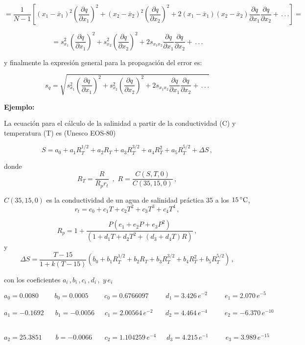 \documentclass[
]{agujournal2019}
\begin{document}
\[=\frac{1}{N-1}\left[
\left(x_1 - \bar{x}_1\right)^2\left(\frac{\partial{q}}{\partial{x_1}}\right)^2 +
\left(x_2 - \bar{x}_2\right)^2\left(\frac{\partial{q}}{\partial{x_2}}\right)^2 +
2\left(x_1 - \bar{x}_1\right)\left(x_2 - \bar{x}_2\right)
\frac{\partial{q}}{\partial{x_1}}\frac{\partial{q}}{\partial{x_2}}+\,.\,.\,.\right]=\]

\[=s^2_{x_1}\left(\frac{\partial{q}}{\partial{x_1}}\right)^2 +
   s^2_{x_2}\left(\frac{\partial{q}}{\partial{x_2}}\right)^2+
   2 s_{{x_1}{x_2}}
   \frac{\partial{q}}{\partial{x_1}}\frac{\partial{q}}{\partial{x_2}}+\,.\,.\,.\]

y finalmente la expresión general para la propagación del error es:

\[s_{q}=\sqrt{s^2_{x_1}\left(\frac{\partial{q}}{\partial{x_1}}\right)^2 +
               s^2_{x_2}\left(\frac{\partial{q}}{\partial{x_2}}\right)^2+
                2 s_{{x_1}{x_2}}
                \frac{\partial{q}}{\partial{x_1}}\frac{\partial{q}}{\partial{x_2}}+\,.\,.\,.}\]

\vspace{0.5cm}

\textbf{Ejemplo:}

\noindent La ecuación para el cálculo de la salinidad a partir de la
conductividad (C) y temperatura (T) es (Unesco EOS-80)

\[S=a_0+a_1 R_T^{1/2}+a_2 R_T+a_3 R_T^{3/2}+a_4 R_T^{2}+a_5 R_T^{5/2}+\Delta{S}\,,\]

donde
\[R_T=\frac{R}{R_p r_t}\,\,\,,\,\,R=\frac{C(S,T,0)}{C(35,15,0)}\,,\]

\(C(35,15,0)\) es la conductividad de un agua de salinidad práctica 35 a
los \(15\,^\circ{\rm C}\),
\[r_t=c_0 + c_1 T + c_2 T^2 + c_3T^3 + c_4T^4\,,\]

\[R_p=1+\frac{P(e_1+e_2P+e_3P^2)}{(1+d_1T+d_2T^2+(d_3 + d_4T)R)}\,,\] y
\[\Delta{S}=\frac{T-15}{1+k(T-15)}(b_0+b_1 R_T^{1/2}+b_2 R_T+b_3 R_T^{3/2}+b_4 R_T^{2}+b_5 R_T^{5/2})\,,\]

con los coeficientes \(a_i\,,b_i\,,c_i\,,d_i\,,\,\,y\,e_i\)~

\(a_0=0.0080\,\,\,\,\,\,\,\,\,\,\,\,\,\,b_0=0.0005\,\,\,\,\,\,\,\,\,\,\,\,\,\,c_0=0.6766097\,\,\,\,\,\,\,\,\,\,\,\,\,\,\,d_1=3.426\,e^{-2}\,\,\,\,\,\,\,\,\,\,\,\,\,\,\,e_1=2.070\,e^{-5}\)
~\(a_1=-0.1692\,\,\,\,\,\,\,\,\,\,b_1=-0.0056\,\,\,\,\,\,\,\,\,c_1=2.00564\,e^{-2}\,\,\,\,\,\,\,\,\,\,\,d_2=4.464\,e^{-4}\,\,\,\,\,\,\,\,\,\,\,\,\,\,\,e_2=-6.370\,e^{-10}\)
~

\(a_2=25.3851\,\,\,\,\,\,\,\,\,\,\,\,b=-0.0066\,\,\,\,\,\,\,\,\,\,\,c_2=1.104259\,e^{-4}\,\,\,\,\,\,\,\,\,d_3=4.215\,e^{-1}\,\,\,\,\,\,\,\,\,\,\,\,\,\,\,e_3=3.989\,e^{-15}\)\\
\end{document}
